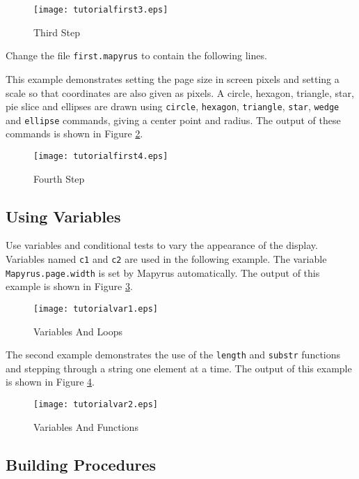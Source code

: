 \begin{figure}[htb]
\texttt{[image: tutorialfirst3.eps]}
\caption{Third Step}
\label{tutorialfirst3}
\end{figure}

Change the file \texttt{first.mapyrus} to contain the following lines.



This example demonstrates setting the page size in
screen pixels and setting a scale so that coordinates
are also given as pixels.
A circle, hexagon, triangle, star, pie slice and ellipses
are drawn using \texttt{circle},
\texttt{hexagon}, \texttt{triangle}, \texttt{star},
\texttt{wedge} and \texttt{ellipse} commands,
giving a center point and radius.
The output of these commands is shown in Figure \ref{tutorialfirst4}.

\begin{figure}[htb]
\texttt{[image: tutorialfirst4.eps]}
\caption{Fourth Step}
\label{tutorialfirst4}
\end{figure}

\subsection{Using Variables}

Use variables and conditional tests to vary the appearance
of the display.
Variables named \texttt{c1} and \texttt{c2} are used in the
following example.  The variable
\texttt{Mapyrus.page.width}
is set by Mapyrus automatically.
The output of this example is shown in Figure \ref{tutorialvar1}.



\begin{figure}[htb]
\texttt{[image: tutorialvar1.eps]}
\caption{Variables And Loops}
\label{tutorialvar1}
\end{figure}

The second example demonstrates the use of the
\texttt{length} and \texttt{substr}
functions
and stepping through a string one element at a time.
The output of this example is shown in Figure \ref{tutorialvar2}.



\begin{figure}[htb]
\texttt{[image: tutorialvar2.eps]}
\caption{Variables And Functions}
\label{tutorialvar2}
\end{figure}


\subsection{Building Procedures}

